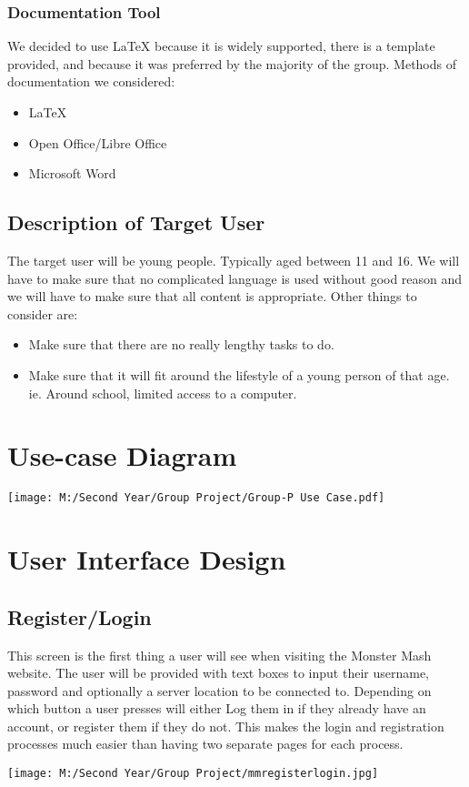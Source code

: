 \documentclass[titlepage]{article}
\begin{document}
\subsubsection{Documentation Tool}
We decided to use \LaTeX{} because it is widely supported, there is a template provided, and because it was preferred by the majority of the group. Methods of documentation we considered:
\begin{itemize}
\item{\LaTeX{}}
\item{Open Office/Libre Office}
\item{Microsoft Word}
\end{itemize}
\subsection{Description of Target User}
The target user will be young people. Typically aged between 11 and 16. We will have to make sure that no complicated language is used without good reason and we will have to make sure that all content is appropriate. Other things to consider are:
\begin{itemize}
\item{Make sure that there are no really lengthy tasks to do.}
\item{Make sure that it will fit around the lifestyle of a young person of that age. ie. Around school, limited access  to a computer.}
\end{itemize}
\newpage
\section{Use-case Diagram}
\begin{figure*}[h]
\centering
\texttt{[image: M:/Second Year/Group Project/Group-P Use Case.pdf]}
\label{fig:Group-P Use Case}
\end{figure*}
\newpage
\section{User Interface Design}
\subsection{Register/Login}
This screen is the first thing a user will see when visiting the Monster Mash website. The user will be provided with text boxes to input their username, password and optionally a server location to be connected to. Depending on which button a user presses will either Log them in if they already have an account, or register them if they do not. This makes the login and registration processes much easier than having two separate pages for each process.
\begin{figure*}[h]
\centering
\texttt{[image: M:/Second Year/Group Project/mmregisterlogin.jpg]}
\label{fig:mmregisterlogin}
\end{figure*}
\newpage
\end{document}
